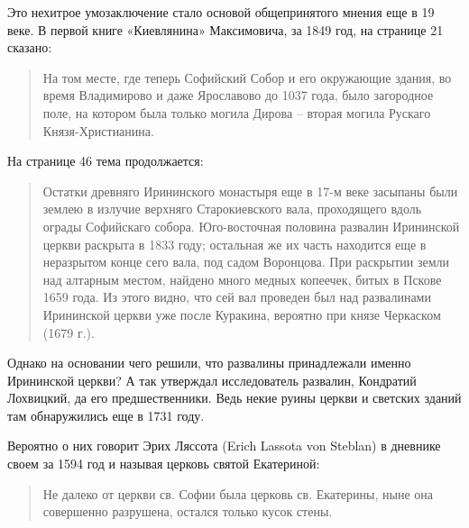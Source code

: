 Это нехитрое умозаключение стало основой общепринятого мнения еще в 19 веке. В первой книге «Киевлянина» Максимовича, за 1849 год, на странице 21 сказано:

\begin{quotation}
На том месте, где теперь Софийский Собор и его окружающие здания, во время Владимирово и даже Ярославово до 1037 года, было загородное поле, на котором была только могила Дирова – вторая могила Рускаго Князя-Христианина.
\end{quotation}

На странице 46 тема продолжается:

\begin{quotation}
Остатки древняго Ирининского монастыря еще в 17-м веке засыпаны были землею в излучие верхняго Старокиевского вала, проходящего вдоль ограды Софийскаго собора. Юго-восточная половина развалин Ирининской церкви раскрыта в 1833 году; остальная же их часть находится еще в неразрытом конце сего вала, под садом Воронцова. При раскрытии земли над алтарным местом, найдено много медных копеечек, битых в Пскове 1659 года. Из этого видно, что сей вал проведен был над развалинами Ирининской церкви уже после Куракина, вероятно при князе Черкаском (1679 г.).
\end{quotation}

Однако на основании чего решили, что развалины принадлежали именно Ирининской церкви? А так утверждал исследователь развалин, Кондратий Лохвицкий, да его предшественники. Ведь некие руины церкви и светских зданий там обнаружились еще в 1731 году.

Вероятно о них говорит Эрих Ляссота (Erich Lassota von Steblan) в дневнике своем за 1594 год и называя церковь святой Екатериной:

\begin{quotation}
Не далеко от церкви св. Софии была церковь св. Екатерины, ныне она совершенно разрушена, остался только кусок стены.
\end{quotation}

 

